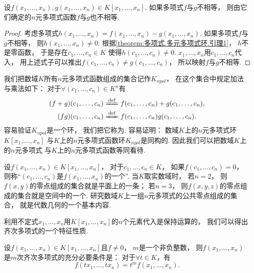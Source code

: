 \begin{theorem}
设\(f(x_1,\dotsc,x_n),g(x_1,\dotsc,x_n) \in K[x_1,\dotsc,x_n]\).
如果多项式\(f\)与\(g\)不相等，
则由它们确定的\(n\)元多项式函数\(f\)与\(g\)也不相等.
\begin{proof}
考虑多项式\(
	h(x_1,\dotsc,x_n)
	=f(x_1,\dotsc,x_n)
	-g(x_1,\dotsc,x_n)
\).
如果多项式\(f\)与\(g\)不相等，
则\(h(x_1,\dotsc,x_n)\neq0\).
根据\cref{theorem:多项式.多元多项式环.引理1}，
\(h\)不是零函数，
于是存在\(c_1,\dotsc,c_n \in K\)
使得\(h(c_1,\dotsc,c_n)\neq0\).
\(x_1,\dotsc,x_n\)用\(c_1,\dotsc,c_n\)代入，
用上述式子可以推出\(f(c_1,\dotsc,c_n) \neq g(c_1,\dotsc,c_n)\)，
所以映射\(f\)与\(g\)不相等.
\end{proof}
\end{theorem}

我们把数域\(K\)所有\(n\)元多项式函数组成的集合记作\(K_{npol}\)，
在这个集合中规定加法与乘法如下：
对于\(\forall(c_1,\dotsc,c_n) \in K^n\)有\begin{gather*}
	(f+g)(c_1,\dotsc,c_n)
	\defeq
	f(c_1,\dotsc,c_n)+g(c_1,\dotsc,c_n), \\
	(fg)(c_1,\dotsc,c_n)
	\defeq
	f(c_1,\dotsc,c_n) g(c_1,\dotsc,c_n).
\end{gather*}
容易验证\(K_{npol}\)是一个环，
我们把它称为.
容易证明：
数域\(K\)上的\(n\)元多项式环\(K[x_1,\dotsc,x_n]\)
与\(K\)上的\(n\)元多项式函数环\(K_{npol}\)是同构的.
因此我们可以把数域\(K\)上的\(n\)元多项式
与\(K\)上的\(n\)元多项式函数等同看待.

设\(f(x_1,\dotsc,x_n) \in K[x_1,\dotsc,x_n]\)，
对于\(c_1,\dotsc,c_n \in K\)，
如果\(f(c_1,\dotsc,c_n)=0\)，
则称“\((c_1,\dotsc,c_n)\)是\(f(x_1,\dotsc,x_n)\)的一个”.
当\(K\)取实数域时，
若\(n=2\)，
则\(f(x,y)\)的零点组成的集合就是平面上的一条；
若\(n=3\)，
则\(f(x,y,z)\)的零点组成的集合就是空间中的一个.
研究数域\(K\)上一组\(n\)元多项式的公共零点组成的集合，
就是代数几何的一个基本内容.

利用不定式\(x_1,\dotsc,x_n\)用\(K[x_1,\dotsc,x_n]\)的\(n\)个元素代入是保持运算的，
我们可以得出齐次多项式的一个特征性质.
\begin{theorem}
设\(f(x_1,\dotsc,x_n) \in K[x_1,\dotsc,x_n]\)且\(f\neq0\)，
\(m\)是一个非负整数，
则\(f(x_1,\dotsc,x_n)\)是\(m\)次齐次多项式的充分必要条件是：
对于\(\forall t \in K\)，有\[
	f(t x_1,\dotsc,t x_n)
	= t^m f(x_1,\dotsc,x_n).
\]
\end{theorem}
